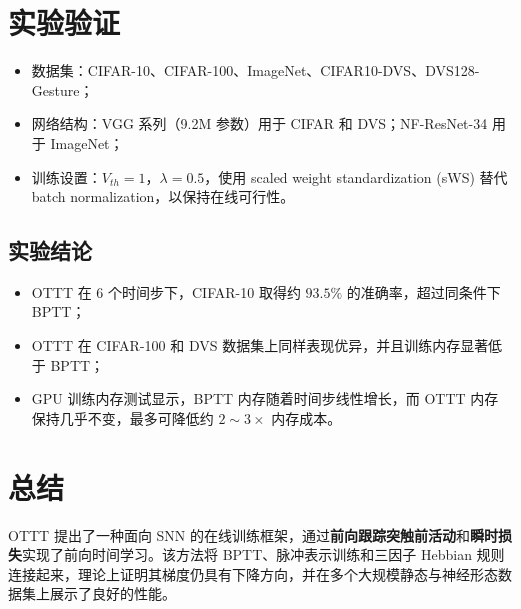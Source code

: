 \documentclass[journal,12pt,onecolumn]{IEEEtran}
\begin{document}
\section{实验验证}
\begin{itemize}[leftmargin=*]
  \item 数据集：CIFAR-10、CIFAR-100、ImageNet、CIFAR10-DVS、DVS128-Gesture；
  \item 网络结构：VGG 系列（9.2M 参数）用于 CIFAR 和 DVS；NF-ResNet-34 用于 ImageNet；
  \item 训练设置：$V_{th}=1$，$\lambda=0.5$，使用 scaled weight standardization (sWS) 替代 batch normalization，以保持在线可行性。
\end{itemize}

\subsection{实验结论}
\begin{itemize}[leftmargin=*]
  \item OTTT 在 6 个时间步下，CIFAR-10 取得约 $93.5\%$ 的准确率，超过同条件下 BPTT；
  \item OTTT 在 CIFAR-100 和 DVS 数据集上同样表现优异，并且训练内存显著低于 BPTT；
  \item GPU 训练内存测试显示，BPTT 内存随着时间步线性增长，而 OTTT 内存保持几乎不变，最多可降低约 $2\sim3\times$ 内存成本。
\end{itemize}

\section{总结}
OTTT 提出了一种面向 SNN 的在线训练框架，通过\textbf{前向跟踪突触前活动}和\textbf{瞬时损失}实现了前向时间学习。该方法将 BPTT、脉冲表示训练和三因子 Hebbian 规则连接起来，理论上证明其梯度仍具有下降方向，并在多个大规模静态与神经形态数据集上展示了良好的性能。\newline



\end{document}
